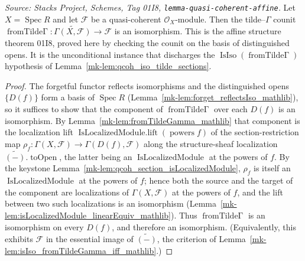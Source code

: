 \begin{lemma}
  \label{mk-lem:qcoh_isIso_fromTildeGamma}

  \textit{Source: Stacks Project, Schemes, Tag 01I8, \texttt{lemma-quasi-coherent-affine}.}
  Let \(X = \operatorname{Spec} R\) and let \(\mathcal{F}\) be a quasi-coherent
  \(\mathcal{O}_X\)-module. Then the tilde--\(\Gamma\) counit
  \(\operatorname{fromTilde\Gamma} : \widetilde{\Gamma(X, \mathcal{F})} \to \mathcal{F}\) is an
  isomorphism. This is the affine structure theorem 01I8, proved here by checking the counit on the
  basis of distinguished opens. It is the unconditional instance that discharges the
  \(\operatorname{IsIso}(\operatorname{fromTilde\Gamma})\) hypothesis of
  Lemma~\ref{mk-lem:qcoh_iso_tilde_sections}.
\end{lemma}
\begin{proof}
  The forgetful functor reflects isomorphisms and the distinguished opens \(\{D(f)\}\) form a basis
  of \(\operatorname{Spec} R\) (Lemma~\ref{mk-lem:forget_reflectsIso_mathlib}), so it suffices to show
  that the component of \(\operatorname{fromTilde\Gamma}\) over each \(D(f)\) is an isomorphism. By
  Lemma~\ref{mk-lem:fromTildeGamma_mathlib} that component is the localization lift
  \(\operatorname{IsLocalizedModule.lift}(\operatorname{powers} f)\) of the section-restriction map
  \(\rho_f : \Gamma(X, \mathcal{F}) \to \Gamma(D(f), \mathcal{F})\) along the structure-sheaf
  localization \(\widetilde{(-)}.\operatorname{toOpen}\), the latter being an
  \(\operatorname{IsLocalizedModule}\) at the powers of \(f\). By the keystone
  Lemma~\ref{mk-lem:qcoh_section_isLocalizedModule}, \(\rho_f\) is itself an
  \(\operatorname{IsLocalizedModule}\) at the powers of \(f\); hence both the source and the target of
  the component are localizations of \(\Gamma(X, \mathcal{F})\) at the powers of \(f\), and the lift
  between two such localizations is an isomorphism
  (Lemma~\ref{mk-lem:isLocalizedModule_linearEquiv_mathlib}). Thus
  \(\operatorname{fromTilde\Gamma}\) is an isomorphism on every \(D(f)\), and therefore an
  isomorphism. (Equivalently, this exhibits \(\mathcal{F}\) in the essential image of
  \(\widetilde{(-)}\), the criterion of Lemma~\ref{mk-lem:isIso_fromTildeGamma_iff_mathlib}.)
\end{proof}

